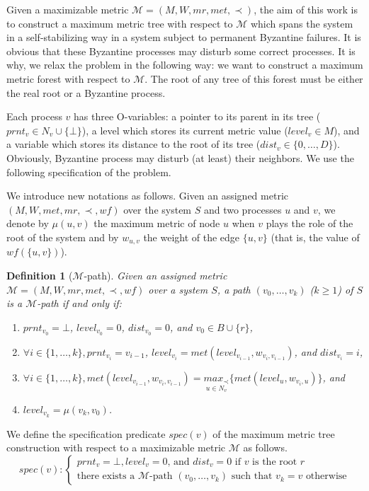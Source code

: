 \documentclass[11pt]{article}
\newtheorem{defi}{Definition}
\newenvironment{definition}[1]{\vspace{-0.25cm}\begin{defi}#1}{\end{defi}\vspace{-0.3cm}}
\begin{document}
Given a maximizable metric $\mathcal{M}=(M,W,mr,met,\prec)$, the aim of this work is to construct a maximum metric tree with respect to $\mathcal{M}$ which spans the system in a self-stabilizing way in a system subject to permanent Byzantine failures. It is obvious that these Byzantine processes may disturb some correct processes. It is why, we relax the problem in the following way: we want to construct a maximum metric forest with respect to $\mathcal{M}$. The root of any tree of this forest must be either the real root or a Byzantine process. 

Each process $v$ has three O-variables: a pointer to its parent in its tree ($prnt_v\in N_v\cup\{\bot\}$), a level which stores its current metric value ($level_v\in M$), and a variable which stores its distance to the root of its tree ($dist_v\in\{0,\ldots,D\}$). Obviously, Byzantine process may disturb (at least) their neighbors. We use the following specification of the problem.

We introduce new notations as follows. Given an assigned metric $(M,W,met,mr,\prec,wf)$ over the system $S$ and two processes $u$ and $v$, we denote by $\mu(u,v)$ the maximum metric of node $u$ when $v$ plays the role of the root of the system and by $w_{u,v}$ the weight of the edge $\{u,v\}$ (that is, the value of $wf(\{u,v\})$).

\begin{definition}[$\mathcal{M}$-path]
Given an assigned metric $\mathcal{M}=(M,W,mr,met,\prec,wf)$ over a system $S$, a path $(v_0,\ldots,v_k)$ ($k\geq 1$) of $S$ is a \emph{$\mathcal{M}$-path} if and only if:
\begin{enumerate}
\item $prnt_{v_0}=\bot$, $level_{v_0}=0$, $dist_{v_0}=0$, and $v_0\in B\cup\{r\}$,
\item $\forall i\in\{1,\ldots,k\}, prnt_{v_i}=v_{i-1}$, $level_{v_i}=met(level_{v_{i-1}},w_{v_i,v_{i-1}})$, and $dist_{v_i}=i$,
\item $\forall i\in\{1,\ldots,k\}, met(level_{v_{i-1}},w_{v_i,v_{i-1}})=\underset{u\in N_v}{max_\prec}\{met(level_{u},w_{v_i,u})\}$, and
\item $level_{v_{k}}=\mu(v_k,v_0)$.
\end{enumerate}
\end{definition}

We define the specification predicate $spec(v)$ of the maximum metric tree construction with respect to a maximizable metric $\mathcal{M}$ as follows.
\[spec(v) : \begin{cases}
 prnt_v = \bot,  level_v = 0 \text{, and } dist_v=0 \text{ if } v \text{ is the root } r \\
 \text{there exists a }\mathcal{M}\text{-path } (v_0,\ldots,v_k) \text{ such that } v_k=v \text{ otherwise}
\end{cases}\]
\end{document}
